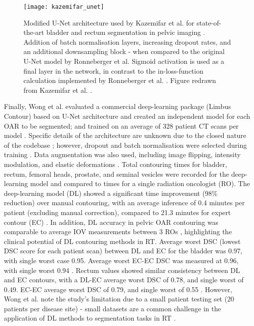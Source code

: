 \begin{figure}[h]
	\begin{center}
		\texttt{[image: kazemifar\_unet]}
		\caption{Modified U-Net architecture used by Kazemifar et al. for
      state-of-the-art bladder and rectum segmentation in pelvic imaging
      \cite{Kazemifar_2018}. Addition of batch normalisation layers, increasing
      dropout rates, and an additional downsampling block - when compared to the
      original U-Net model by Ronneberger et al. Sigmoid activation is used as a
      final layer in the network, in contrast to the in-loss-function calculation
      implemented by Ronneberger et al. \cite{Ronneberger_2015}. Figure redrawn from
      Kazemifar et al. \cite{Kazemifar_2018}.}
		\label{fig:kazemifar_unet}
	\end{center}
\end{figure}

Finally, Wong et al. evaluated a commercial deep-learning package (Limbus
Contour) based on U-Net architecture and created an independent model for each
OAR to be segmented; and trained on an average of 328 patient CT scans per model
\cite{Wong2020}. Specific details of the architecture are unknown due to the
closed nature of the codebase \cite{Wong2020}; however, dropout and batch
normalisation were selected during training \cite{Wong2020}. Data augmentation
was also used, including image flipping, intensity modulation, and elastic
deformations \cite{Wong2020}. Total contouring times for bladder, rectum,
femoral heads, prostate, and seminal vesicles were recorded for the
deep-learning model and compared to times for a single radiation oncologist
(RO). The deep-learning model (DL) showed a significant time improvement (98\%
reduction) over manual contouring, with an average inference of 0.4 minutes per
patient (excluding manual correction), compared to 21.3 minutes for expert
contour (EC) \cite{Wong2020}. In addition, DL accuracy in pelvic OAR contouring
was comparable to average IOV measurements between 3 ROs \cite{Wong2020},
highlighting the clinical potential of DL contouring methods in RT. Average
worst DSC (lowest DSC score for each patient scan) between DL and EC for the
bladder was 0.97, with single worst case 0.95. Average worst EC-EC DSC was
measured at 0.96, with single worst 0.94 \cite{Wong2020}. Rectum values showed
similar consistency between DL and EC contours, with a DL-EC average worst DSC
of 0.78, and single worst of 0.49. EC-EC average worst DSC of 0.79, and single
worst of 0.55 \cite{Wong2020}. However, Wong et al. note the study's limitation
due to a small patient testing set (20 patients per disease site)
\cite{Wong2020} - small datasets are a common challenge in the application of DL
methods to segmentation tasks in RT \cite{Ronneberger_2015, Maier2019,
Hesamian2019, Lundervold2019}.

